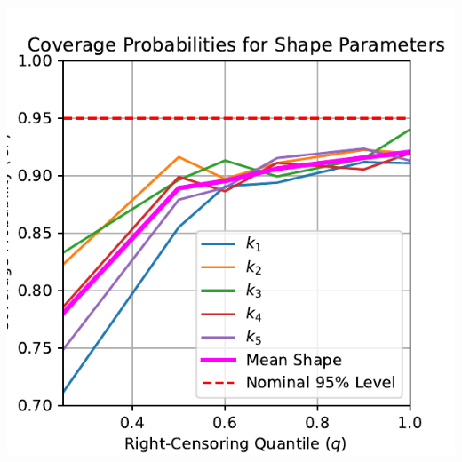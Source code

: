 \documentclass{article}
\begin{document}
\begin{minipage}[t]{0.5\textwidth}
  \vspace{0.5mm}
  \includegraphics[width=\textwidth,height=0.33\textheight,keepaspectratio]{shapes-cp.pdf}
\end{minipage}%
\end{document}
